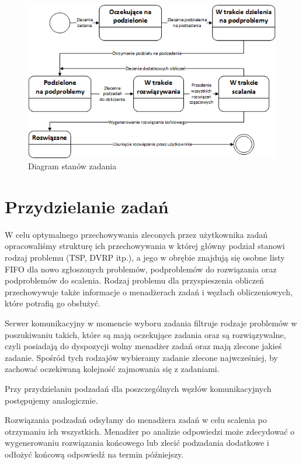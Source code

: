 \documentclass{report}
\begin{document}
	\begin{figure}[h]
		\centering
		\includegraphics[width=\textwidth]{img/state/Task.png}
		\caption{Diagram stanów zadania}
	\end{figure}
	
\section{Przydzielanie zadań}
	W celu optymalnego przechowywania zleconych przez użytkownika zadań opracowaliśmy
	strukturę ich przechowywania w której główny podział stanowi rodzaj problemu
	(TSP, DVRP itp.), a jego w obrębie znajdują się osobne listy FIFO dla nowo zgłoszonych problemów,
	podproblemów do rozwiązania oraz podproblemów do scalenia. Rodzaj problemu dla przyspieszenia obliczeń
	przechowywuje także informacje o menadżerach zadań i węzłach obliczeniowych, które potrafią
	go obsłużyć. 
	
	Serwer komunikacyjny w momencie wyboru zadania filtruje rodzaje problemów w poszukiwaniu takich,
	które są mają oczekujące zadania oraz są rozwiązywalne, czyli posiadają do dyspozycji wolny menadżer zadań 
	oraz mają zlecone jakieś zadanie. Spośród tych rodzajów wybieramy zadanie zlecone najwcześniej, by zachować
	oczekiwaną kolejność zajmowania się z zadaniami.
	
	Przy przydzielaniu podzadań dla poszczególnych węzłów komunikacyjnych postępujemy analogicznie.
	
	Rozwiązania podzadań odsyłamy do menadżera zadań w celu scalenia po otrzymaniu ich wszystkich. Menadżer
	po analizie odpowiedzi może zdecydować o wygenerowaniu rozwiązania końcowego lub zlecić podzadania dodatkowe
	i odłożyć końcową odpowiedź na termin późniejszy. 
	
\end{document}
